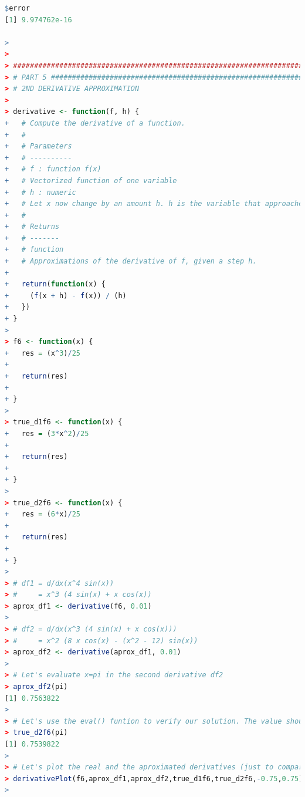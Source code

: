 \documentclass[11pt,a4paper]{article}
\begin{document}
\begin{lstlisting}[frame=trBL, language=R]
$error
[1] 9.974762e-16

> 
> 
> #####################################################################
> # PART 5 ############################################################
> # 2ND DERIVATIVE APPROXIMATION
> 
> derivative <- function(f, h) {
+   # Compute the derivative of a function.
+   #
+   # Parameters
+   # ----------
+   # f : function f(x)
+   # Vectorized function of one variable
+   # h : numeric
+   # Let x now change by an amount h. h is the variable that approaches 0
+   # 
+   # Returns
+   # -------
+   # function
+   # Approximations of the derivative of f, given a step h.
+   
+   return(function(x) {
+     (f(x + h) - f(x)) / (h)
+   })
+ }
> 
> f6 <- function(x) {
+   res = (x^3)/25
+   
+   return(res)
+   
+ }
> 
> true_d1f6 <- function(x) {
+   res = (3*x^2)/25
+   
+   return(res)
+   
+ }
> 
> true_d2f6 <- function(x) {
+   res = (6*x)/25
+   
+   return(res)
+   
+ }
> 
> # df1 = d/dx(x^4 sin(x))
> #     = x^3 (4 sin(x) + x cos(x))
> aprox_df1 <- derivative(f6, 0.01)
> 
> # df2 = d/dx(x^3 (4 sin(x) + x cos(x)))
> #     = x^2 (8 x cos(x) - (x^2 - 12) sin(x))
> aprox_df2 <- derivative(aprox_df1, 0.01)
> 
> # Let's evaluate x=pi in the second derivative df2
> aprox_df2(pi)
[1] 0.7563822
> 
> # Let's use the eval() funtion to verify our solution. The value should be around df2(pi)
> true_d2f6(pi)
[1] 0.7539822
> 
> # Let's plot the real and the aproximated derivatives (just to compare)
> derivativePlot(f6,aprox_df1,aprox_df2,true_d1f6,true_d2f6,-0.75,0.75)
> 
\end{lstlisting}

\clearpage

\end{document}
